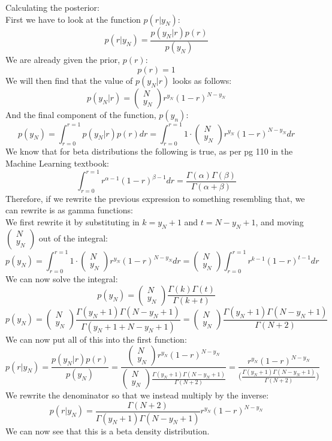 Calculating the posterior:\\
First we have to look at the function $p(r|y_N)$:
$$
p(r|y_N) = \frac{p(y_N|r)p(r)}{p(y_N)}
$$
We are already given the prior, $p(r)$:
$$
p(r) = 1
$$
We will then find that the value of $p(y_N|r)$ looks as follows:
$$
p(y_N|r) = \begin{pmatrix} N\\ y_N \end{pmatrix} r^{y_N} (1-r)^{N-y_N}
$$
And the final component of the function, $p(y_n)$:
$$
p(y_N) = \int^{r=1}_{r=0} p(y_N|r)p(r)dr = \int^{r=1}_{r=0} 1 \cdot \begin{pmatrix} N\\ y_N \end{pmatrix} r^{y_N} (1-r)^{N-y_N}dr
$$
We know that for beta distributions the following is true, as per pg 110 in the Machine Learning textbook:
$$
\int^{r=1}_{r=0}r^{\alpha-1}(1-r)^{\beta-1}dr = \frac{\Gamma(\alpha)\Gamma(\beta)}{\Gamma(\alpha + \beta)}
$$
Therefore, if we rewrite the previous expression to something resembling that, we can rewrite is as gamma functions:\\
We first rewrite it by substituting in $k=y_N+1$ and $t = N-y_N+1$, and moving $\begin{pmatrix} N\\ y_N \end{pmatrix}$ out of the integral:
$$
p(y_N)=\int^{r=1}_{r=0} 1 \cdot \begin{pmatrix} N\\ y_N \end{pmatrix} r^{y_N} (1-r)^{N-y_N}dr = \begin{pmatrix} N\\ y_N \end{pmatrix} \int^{r=1}_{r=0}r^{k-1}(1-r)^{t-1}dr
$$
We can now solve the integral:
$$
p(y_N) = \begin{pmatrix} N\\ y_N \end{pmatrix} \frac{\Gamma(k)\Gamma(t)}{\Gamma(k + t)}
$$
$$
p(y_N) = \begin{pmatrix} N\\ y_N \end{pmatrix} \frac{\Gamma(y_N+1)\Gamma(N-y_N+1)}{\Gamma(y_N+1 + N-y_N+1)} = \begin{pmatrix} N\\ y_N \end{pmatrix} \frac{\Gamma(y_N+1)\Gamma(N-y_N+1)}{\Gamma(N+2)}
$$
We can now put all of this into the first function:
$$
p(r|y_N) = \frac{p(y_N|r)p(r)}{p(y_N)} = \frac{\begin{pmatrix} N\\ y_N \end{pmatrix} r^{y_N} (1-r)^{N-y_N}}{\begin{pmatrix} N\\ y_N \end{pmatrix} \frac{\Gamma(y_N+1)\Gamma(N-y_N+1)}{\Gamma(N+2)}} = \frac{r^{y_N} (1-r)^{N-y_N}}{\Big(\frac{\Gamma(y_N+1)\Gamma(N-y_N+1)}{\Gamma(N+2)}\Big)}
$$
We rewrite the denominator so that we instead multiply by the inverse:
$$
p(r|y_N) = \frac{\Gamma(N+2)}{\Gamma(y_N+1)\Gamma(N-y_N+1)}r^{y_N} (1-r)^{N-y_N}
$$
We can now see that this is a beta density distribution.